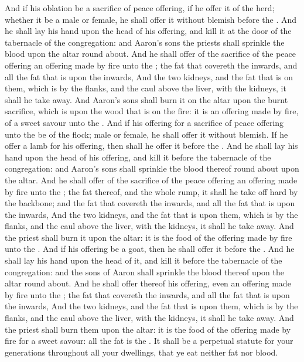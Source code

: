 \begin{biblechapter} %
 And if his oblation be a sacrifice of peace offering, if he offer it of the herd; whether it be a male or female, he shall offer it without blemish before the \LORD.
\verse And he shall lay his hand upon the head of his offering, and kill it at the door of the tabernacle of the congregation: and Aaron's sons the priests shall sprinkle the blood upon the altar round about.
\verse And he shall offer of the sacrifice of the peace offering an offering made by fire unto the \LORD; the fat that covereth the inwards, and all the fat that is upon the inwards,
\verse And the two kidneys, and the fat that is on them, which is by the flanks, and the caul above the liver, with the kidneys, it shall he take away.
\verse And Aaron's sons shall burn it on the altar upon the burnt sacrifice, which is upon the wood that is on the fire: it is an offering made by fire, of a sweet savour unto the \LORD.
\verse And if his offering for a sacrifice of peace offering unto the \LORD be of the flock; male or female, he shall offer it without blemish.
\verse If he offer a lamb for his offering, then shall he offer it before the \LORD.
\verse And he shall lay his hand upon the head of his offering, and kill it before the tabernacle of the congregation: and Aaron's sons shall sprinkle the blood thereof round about upon the altar.
\verse And he shall offer of the sacrifice of the peace offering an offering made by fire unto the \LORD; the fat thereof, and the whole rump, it shall he take off hard by the backbone; and the fat that covereth the inwards, and all the fat that is upon the inwards,
\verse And the two kidneys, and the fat that is upon them, which is by the flanks, and the caul above the liver, with the kidneys, it shall he take away.
\verse And the priest shall burn it upon the altar: it is the food of the offering made by fire unto the \LORD.
\verse And if his offering be a goat, then he shall offer it before the \LORD.
\verse And he shall lay his hand upon the head of it, and kill it before the tabernacle of the congregation: and the sons of Aaron shall sprinkle the blood thereof upon the altar round about.
\verse And he shall offer thereof his offering, even an offering made by fire unto the \LORD; the fat that covereth the inwards, and all the fat that is upon the inwards,
\verse And the two kidneys, and the fat that is upon them, which is by the flanks, and the caul above the liver, with the kidneys, it shall he take away.
\verse And the priest shall burn them upon the altar: it is the food of the offering made by fire for a sweet savour: all the fat is the \LORDs.
\verse It shall be a perpetual statute for your generations throughout all your dwellings, that ye eat neither fat nor blood.
\end{biblechapter}

